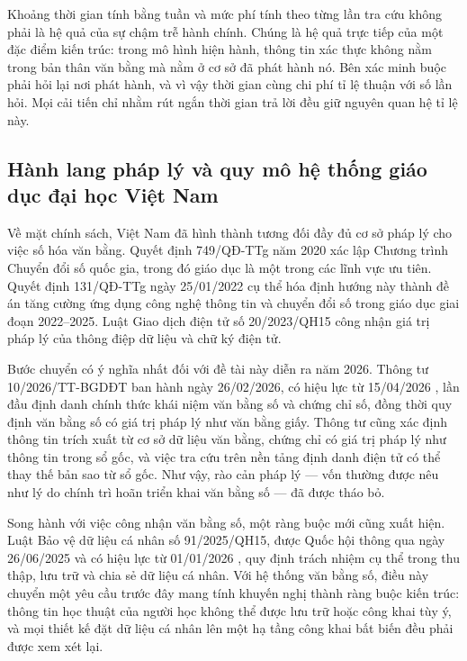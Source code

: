 Khoảng thời gian tính bằng tuần và mức phí tính theo từng lần tra cứu không phải là hệ quả của sự chậm trễ hành chính. Chúng là hệ quả trực tiếp của một đặc điểm kiến trúc: trong mô hình hiện hành, thông tin xác thực không nằm trong bản thân văn bằng mà nằm ở cơ sở đã phát hành nó. Bên xác minh buộc phải hỏi lại nơi phát hành, và vì vậy thời gian cùng chi phí tỉ lệ thuận với số lần hỏi. Mọi cải tiến chỉ nhằm rút ngắn thời gian trả lời đều giữ nguyên quan hệ tỉ lệ này.

\subsection{Hành lang pháp lý và quy mô hệ thống giáo dục đại học Việt Nam}

Về mặt chính sách, Việt Nam đã hình thành tương đối đầy đủ cơ sở pháp lý cho việc số hóa văn bằng. Quyết định 749/QĐ-TTg năm 2020 \cite{QD749_2020} xác lập Chương trình Chuyển đổi số quốc gia, trong đó giáo dục là một trong các lĩnh vực ưu tiên. Quyết định 131/QĐ-TTg ngày 25/01/2022 \cite{QD131_2022} cụ thể hóa định hướng này thành đề án tăng cường ứng dụng công nghệ thông tin và chuyển đổi số trong giáo dục giai đoạn 2022--2025. Luật Giao dịch điện tử số 20/2023/QH15 \cite{LuatGDDT2023} công nhận giá trị pháp lý của thông điệp dữ liệu và chữ ký điện tử.

Bước chuyển có ý nghĩa nhất đối với đề tài này diễn ra năm 2026. Thông tư 10/2026/TT-BGDĐT ban hành ngày 26/02/2026, có hiệu lực từ 15/04/2026 \cite{TT10_2026}, lần đầu định danh chính thức khái niệm văn bằng số và chứng chỉ số, đồng thời quy định văn bằng số có giá trị pháp lý như văn bằng giấy. Thông tư cũng xác định thông tin trích xuất từ cơ sở dữ liệu văn bằng, chứng chỉ có giá trị pháp lý như thông tin trong sổ gốc, và việc tra cứu trên nền tảng định danh điện tử có thể thay thế bản sao từ sổ gốc. Như vậy, rào cản pháp lý --- vốn thường được nêu như lý do chính trì hoãn triển khai văn bằng số --- đã được tháo bỏ.

Song hành với việc công nhận văn bằng số, một ràng buộc mới cũng xuất hiện. Luật Bảo vệ dữ liệu cá nhân số 91/2025/QH15, được Quốc hội thông qua ngày 26/06/2025 và có hiệu lực từ 01/01/2026 \cite{LuatBVDLCN2025}, quy định trách nhiệm cụ thể trong thu thập, lưu trữ và chia sẻ dữ liệu cá nhân. Với hệ thống văn bằng số, điều này chuyển một yêu cầu trước đây mang tính khuyến nghị thành ràng buộc kiến trúc: thông tin học thuật của người học không thể được lưu trữ hoặc công khai tùy ý, và mọi thiết kế đặt dữ liệu cá nhân lên một hạ tầng công khai bất biến đều phải được xem xét lại.

